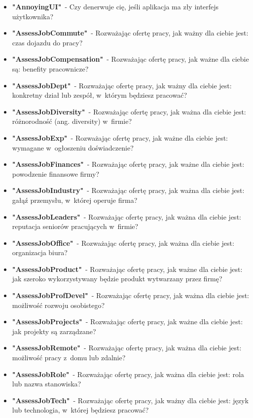 \begin{appendices}
    \begin{itemize}
        \item \textbf{"AnnoyingUI"}~- Czy denerwuje cię, jeśli aplikacja ma zły interfejs użytkownika?
        \item \textbf{"AssessJobCommute"}~- Rozważając ofertę pracy, jak ważny dla ciebie jest: czas dojazdu do pracy?
        \item \textbf{"AssessJobCompensation"}~- Rozważając ofertę pracy, jak ważne dla ciebie są: benefity pracownicze?
        \item \textbf{"AssessJobDept"}~- Rozważając ofertę pracy, jak ważny dla ciebie jest: konkretny dział lub zespół, w~którym będziesz pracować?
        \item \textbf{"AssessJobDiversity"}~- Rozważając ofertę pracy, jak ważna dla ciebie jest: różnorodność (ang. diversity) w~firmie?
        \item \textbf{"AssessJobExp"}~- Rozważając ofertę pracy, jak ważne dla ciebie jest: wymagane w~ogłoszeniu doświadczenie?
        \item \textbf{"AssessJobFinances"}~- Rozważając ofertę pracy, jak ważne dla ciebie jest: powodzenie finansowe firmy?
        \item \textbf{"AssessJobIndustry"}~- Rozważając ofertę pracy, jak ważna dla ciebie jest: gałąź przemysłu, w~której operuje firma?
        \item \textbf{"AssessJobLeaders"}~- Rozważając ofertę pracy, jak ważna dla ciebie jest: reputacja seniorów pracujących w~firmie?
        \item \textbf{"AssessJobOffice"}~- Rozważając ofertę pracy, jak ważna dla ciebie jest: organizacja biura?
        \item \textbf{"AssessJobProduct"}~- Rozważając ofertę pracy, jak ważne dla ciebie jest: jak szeroko wykorzystywany będzie produkt wytwarzany przez firmę?
        \item \textbf{"AssessJobProfDevel"}~- Rozważając ofertę pracy, jak ważna dla ciebie jest: możliwość rozwoju osobistego?
        \item \textbf{"AssessJobProjects"}~- Rozważając ofertę pracy, jak ważne dla ciebie jest: jak projekty są zarządzane?
        \item \textbf{"AssessJobRemote"}~- Rozważając ofertę pracy, jak ważna dla ciebie jest: możliwość pracy z~domu lub zdalnie?
        \item \textbf{"AssessJobRole"}~- Rozważając ofertę pracy, jak ważna dla ciebie jest: rola lub nazwa stanowiska?
        \item \textbf{"AssessJobTech"}~- Rozważając ofertę pracy, jak ważny dla ciebie jest: język lub technologia, w~której będziesz pracować?

\end{itemize}
\end{appendices}
